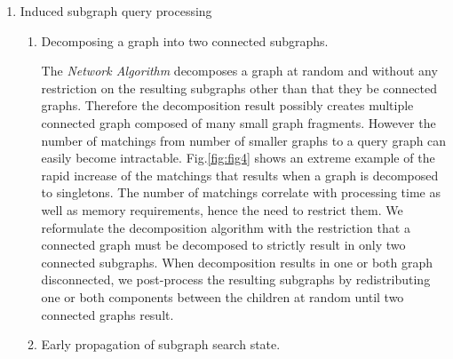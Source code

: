 \begin{enumerate}
\begin{enumerate}
\end{enumerate}


\item Induced subgraph query processing

\begin{enumerate}
\item Decomposing a graph into two connected subgraphs.

The \textit{Network Algorithm} decomposes a graph at random and without any restriction on the resulting subgraphs other than that they be connected graphs.
Therefore the decomposition result possibly creates multiple connected graph composed of many small graph fragments.
However the number of matchings from number of smaller graphs to a query graph can easily become intractable.
Fig.\ref{fig:fig4} shows an extreme example of the rapid increase of the matchings that results when a graph is decomposed to singletons.
The number of matchings correlate with processing time as well as memory requirements, hence the need to restrict them. We reformulate the decomposition algorithm with the restriction that a connected graph must be decomposed to strictly result in only two connected subgraphs. When decomposition results in one or both graph disconnected, we post-process the resulting subgraphs by redistributing one or both components between the children  at random until two connected graphs result.


\item Early propagation of subgraph search state.


\end{enumerate}
\end{enumerate}
